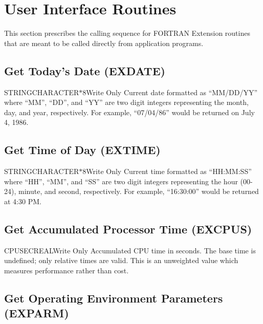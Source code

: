 \section{User Interface Routines}
This section prescribes the calling sequence for FORTRAN Extension routines
that are meant to be called directly from application programs.

\subsection{Get Today's Date (EXDATE)}


\begin{argy}{STRING}{CHARACTER$*$8}{Write Only}
Current date formatted as ``MM/DD/YY'' where ``MM'', ``DD'', and ``YY'' are
two digit integers representing the month, day, and year, respectively.  For
example, ``07/04/86'' would be returned on July 4, 1986.
\end{argy}

\subsection{Get Time of Day (EXTIME)}


\begin{argy}{STRING}{CHARACTER$*$8}{Write Only}
Current time formatted as ``HH:MM:SS'' where ``HH'', ``MM'', and ``SS'' are
two digit integers representing the hour (00-24), minute, and second,
respectively.  For example, ``16:30:00'' would be returned at 4:30 PM.
\end{argy}

\subsection{Get Accumulated Processor Time (EXCPUS)}


\begin{argy}{CPUSEC}{REAL}{Write Only}
Accumulated CPU time in seconds.  The base time is undefined; only relative
times are valid.  This is an unweighted value which measures performance
rather than cost.
\end{argy}

\subsection{Get Operating Environment Parameters (EXPARM)}

